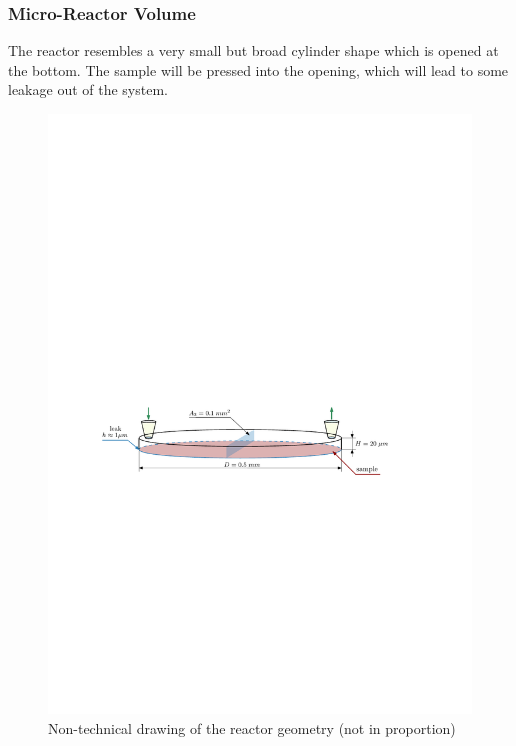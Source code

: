 \subsubsection*{Micro-Reactor Volume}
	The reactor resembles a very small but broad cylinder shape which is opened at the bottom.
	The sample will be pressed into the opening, which will lead to some leakage out of the system.
	\begin{figure}[H]
	    \centering
	    \includegraphics[width=\textwidth]{src/03_analytical-work/fig_reactor-geometry.pdf}
	    \caption{Non-technical drawing of the reactor geometry (not in proportion)}
	    \label{fig:geometry-reactor}
	\end{figure}

